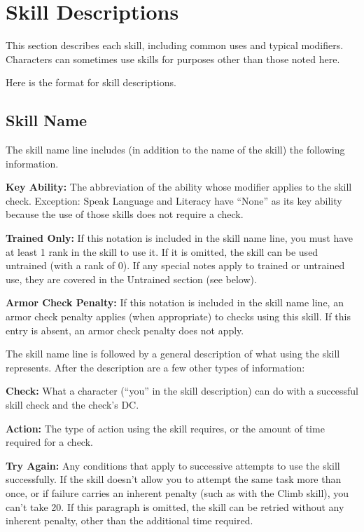 \section{Skill Descriptions}
This section describes each skill, including common uses and typical modifiers. Characters can sometimes use skills for purposes other than those noted here.

Here is the format for skill descriptions.

\subsection{Skill Name}
The skill name line includes (in addition to the name of the skill) the following information.

\textbf{Key Ability:} The abbreviation of the ability whose modifier applies to the skill check. Exception: Speak Language and Literacy have ``None'' as its key ability because the use of those skills does not require a check.

\textbf{Trained Only:} If this notation is included in the skill name line, you must have at least 1 rank in the skill to use it. If it is omitted, the skill can be used untrained (with a rank of 0). If any special notes apply to trained or untrained use, they are covered in the Untrained section (see below).

\textbf{Armor Check Penalty:} If this notation is included in the skill name line, an armor check penalty applies (when appropriate) to checks using this skill. If this entry is absent, an armor check penalty does not apply.

The skill name line is followed by a general description of what using the skill represents. After the description are a few other types of information:

\textbf{Check:} What a character (``you'' in the skill description) can do with a successful skill check and the check’s DC.

\textbf{Action:} The type of action using the skill requires, or the amount of time required for a check.

\textbf{Try Again:} Any conditions that apply to successive attempts to use the skill successfully. If the skill doesn’t allow you to attempt the same task more than once, or if failure carries an inherent penalty (such as with the Climb skill), you can’t take 20. If this paragraph is omitted, the skill can be retried without any inherent penalty, other than the additional time required.

